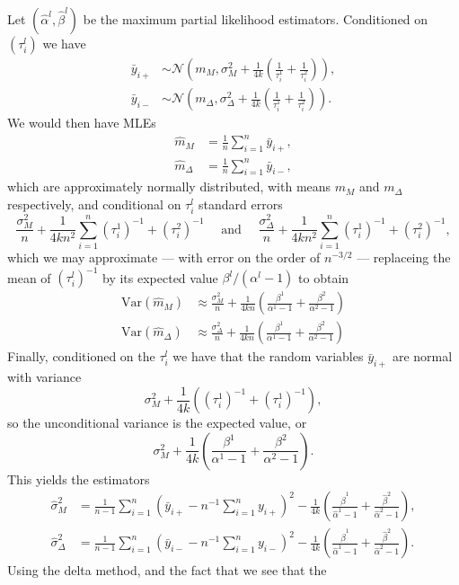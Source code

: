 \documentclass[
]{article}
\begin{document}
Let \((\hat\alpha^l,\hat\beta^l)\) be the maximum partial likelihood
estimators. Conditioned on \((\tau_i^l)\) we have \begin{align*}
  \bar{y}_{i+}&\sim \mathcal{N}\left(m_M, \sigma^2_M + \frac{1}{4k}\left( \frac{1}{\tau_i^1}+\frac{1}{\tau_i^2}\right)\right),\\
  \bar{y}_{i-}&\sim \mathcal{N}\left(m_\Delta,\sigma^2_\Delta + \frac{1}{4k}\left( \frac{1}{\tau_i^1}+\frac{1}{\tau_i^2}\right)\right).
\end{align*} We would then have MLEs \begin{align*}
  \hat{m}_M&= \frac{1}{n} \sum_{i=1}^n \bar{y}_{i+},\\
  \hat{m}_\Delta&= \frac{1}{n} \sum_{i=1}^n \bar{y}_{i-},
\end{align*} which are approximately normally distributed, with means
\(m_M\) and \(m_\Delta\) respectively, and conditional on \(\tau_i^l\)
standard errors \[
  \frac{\sigma_M^2}{n}+\frac{1}{4kn^2} \sum_{i=1}^n (\tau_i^1)^{-1} + (\tau_i^2)^{-1} \quad \text{ and } \quad
  \frac{\sigma_\Delta^2}{n}+\frac{1}{4kn^2} \sum_{i=1}^n (\tau_i^1)^{-1} + (\tau_i^2)^{-1},
\] which we may approximate --- with error on the order of \(n^{-3/2}\)
--- replaceing the mean of \((\tau_i^l)^{-1}\) by its expected value
\(\beta^l/(\alpha^l-1)\) to obtain \begin{align*}
  \mathrm{Var}(\hat{m}_M) &\approx \frac{\sigma_M^2}{n}+\frac{1}{4kn}\left( \frac{\beta^1}{\alpha^1-1}+ \frac{\beta^2}{\alpha^2-1}\right) \\
  \mathrm{Var}(\hat{m}_\Delta) &\approx \frac{\sigma_\Delta^2}{n}+\frac{1}{4kn}\left( \frac{\beta^1}{\alpha^1-1}+ \frac{\beta^2}{\alpha^2-1}\right) 
\end{align*} Finally, conditioned on the \(\tau_i^l\) we have that the
random variables \(\bar{y}_{i+}\) are normal with variance \[
  \sigma_M^2+\frac{1}{4k}\left((\tau_i^1)^{-1} + (\tau_i^1)^{-1} \right),
\] so the unconditional variance is the expected value, or \[
  \sigma_M^2+\frac{1}{4k}\left(\frac{\beta^1}{\alpha^1-1}+ \frac{\beta^2}{\alpha^2-1} \right).
\] This yields the estimators \begin{align*}
  \hat\sigma_M^2 &=\frac{1}{n-1}\sum_{i=1}^n\left(\bar{y}_{i+}-n^{-1}\sum_{i=1}^n y_{i+}\right)^2 - \frac{1}{4k}\left(\frac{\hat\beta^1}{\hat\alpha^1-1}+ \frac{\hat\beta^2}{\hat\alpha^2-1} \right),\\
  \hat\sigma_\Delta^2 &=\frac{1}{n-1}\sum_{i=1}^n\left(\bar{y}_{i-}-n^{-1}\sum_{i=1}^n y_{i-}\right)^2 - \frac{1}{4k}\left(\frac{\hat\beta^1}{\hat\alpha^1-1}+ \frac{\hat\beta^2}{\hat\alpha^2-1} \right).
\end{align*} Using the delta method, and the fact that we see that the
\end{document}
